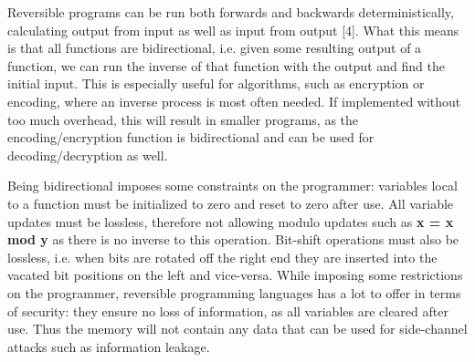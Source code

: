 
Reversible programs can be run both forwards and backwards deterministically, calculating output from input as well as input from output [4].
What this means is that all functions are bidirectional, i.e. given some resulting output of a function, we can run the inverse of that function with the output and find the initial input.
This is especially useful for algorithms, such as encryption or encoding, where an inverse process is most often needed.
If implemented without too much overhead, this will result in smaller programs, as the encoding/encryption function is bidirectional and can be used for decoding/decryption as well.

Being bidirectional imposes some constraints on the programmer: variables local to a function must be initialized to zero and reset to zero after use.
All variable updates must be lossless, therefore not allowing modulo updates such as \textbf{x = x mod y} as there is no inverse to this operation.
Bit-shift operations must also be lossless, i.e. when bits are rotated off the right end they are inserted into the vacated bit positions on the left and vice-versa. While imposing some restrictions on the programmer, reversible programming languages has a lot to offer in terms of security: they ensure no loss of information, as all variables are cleared after use. Thus the memory will not contain any data that can be used for side-channel attacks such as information leakage.
